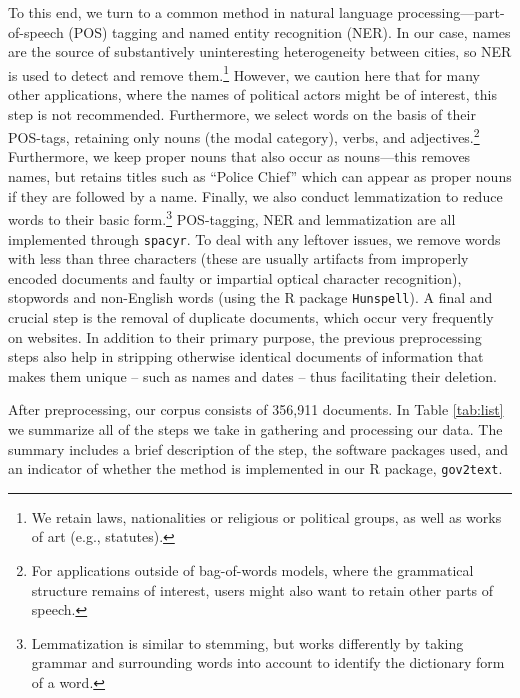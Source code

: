 \documentclass[11pt]{article}
\begin{document}
To this end, we turn to a common method in natural language processing---part-of-speech (POS) tagging and named entity recognition (NER). In our case, names are the source of substantively uninteresting heterogeneity between cities, so NER is used to detect and remove them.\footnote{We retain laws, nationalities or religious or political groups, as well as works of art (e.g., statutes).} However, we caution here that for many other applications, where the names of political actors might be of interest, this step is not recommended. Furthermore, we select words on the basis of their POS-tags, retaining only nouns (the modal category), verbs, and adjectives.\footnote{For applications outside of bag-of-words models, where the grammatical structure remains of interest, users might also want to retain other parts of speech.} Furthermore, we keep proper nouns that also occur as nouns---this removes names, but retains titles such as ``Police Chief'' which can appear as proper nouns if they are followed by a name. Finally, we also conduct lemmatization to reduce words to their basic form.\footnote{Lemmatization is similar to stemming, but works differently by taking grammar and surrounding words into account to identify the dictionary form of a word. } POS-tagging, NER and lemmatization are all implemented through \texttt{spacyr}. To deal with any leftover issues, we remove words with less than three characters (these are usually artifacts from improperly encoded documents and faulty or impartial optical character recognition), stopwords and non-English words (using the R package \texttt{Hunspell}).  A final and crucial step is the removal of duplicate documents, which occur very frequently on websites. In addition to their primary purpose, the previous preprocessing steps also help in stripping otherwise identical documents of information that makes them unique -- such as names and dates -- thus facilitating their deletion. %

After preprocessing, our corpus consists of 356,911 documents.  In Table \ref{tab:list} we summarize all of the steps we take in gathering and processing our data. The summary includes a brief description of the step, the software packages used, and an indicator of whether the method is implemented in our R package, \texttt{gov2text}. 
\end{document}
